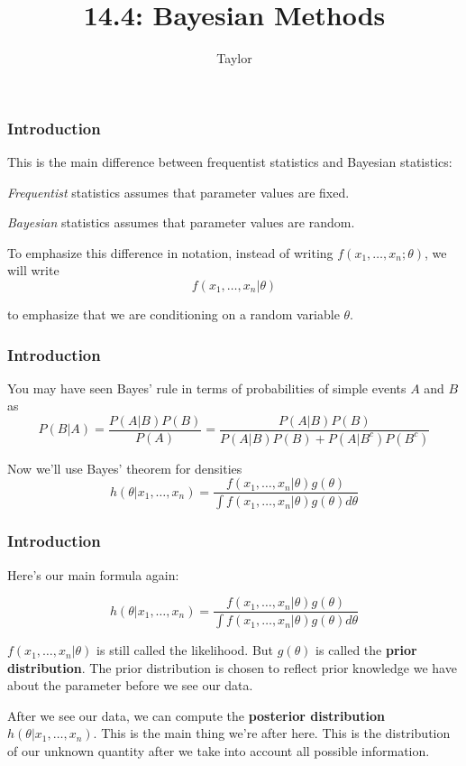 \documentclass{beamer}
\title["14.4"]{14.4: Bayesian Methods}
\author{Taylor}
\institute[UVA] 
{
University of Virginia \\
\medskip
\textit{} 
}
\date{}
\begin{document}

\begin{frame}
\titlepage 
\end{frame}

\begin{frame}
\frametitle{Introduction}

This is the main difference between frequentist statistics and Bayesian statistics:
\newline

\emph{Frequentist} statistics assumes that parameter values are fixed.
\newline

\emph{Bayesian} statistics assumes that parameter values are random.
\newline

To emphasize this difference in notation, instead of writing $f(x_1, \ldots, x_n ; \theta)$, we will write
\[
f(x_1, \ldots, x_n | \theta)
\]

to emphasize that we are conditioning on a random variable $\theta$.
\end{frame}

\begin{frame}
\frametitle{Introduction}

You may have seen Bayes' rule in terms of probabilities of simple events $A$ and $B$ as
\[
P(B|A) = \frac{P(A|B)P(B)}{P(A)} = \frac{P(A|B)P(B)}{P(A|B)P(B) + P(A|B^c)P(B^c) }
\]

Now we'll use Bayes' theorem for densities
\[
h(\theta| x_1, \ldots, x_n) = \frac{f(x_1, \ldots, x_n | \theta) g(\theta)  }{ \int f(x_1, \ldots, x_n | \theta) g(\theta) d \theta }
\]


\end{frame}
\begin{frame}
\frametitle{Introduction}

Here's our main formula again:

\[
h(\theta| x_1, \ldots, x_n) = \frac{f(x_1, \ldots, x_n | \theta) g(\theta)  }{ \int f(x_1, \ldots, x_n | \theta) g(\theta) d \theta }
\]

$f(x_1, \ldots, x_n|\theta)$ is still called the likelihood.  But $g(\theta)$ is called the {\bf prior distribution}. The prior distribution is chosen to reflect prior knowledge we have about the parameter before we see our data. 
\newline

After we see our data, we can compute the {\bf posterior distribution} $h(\theta|x_1, \ldots, x_n)$. This is the main thing we're after here. This is the distribution of our unknown quantity after we take into account all possible information.

\end{frame}
\end{document}
